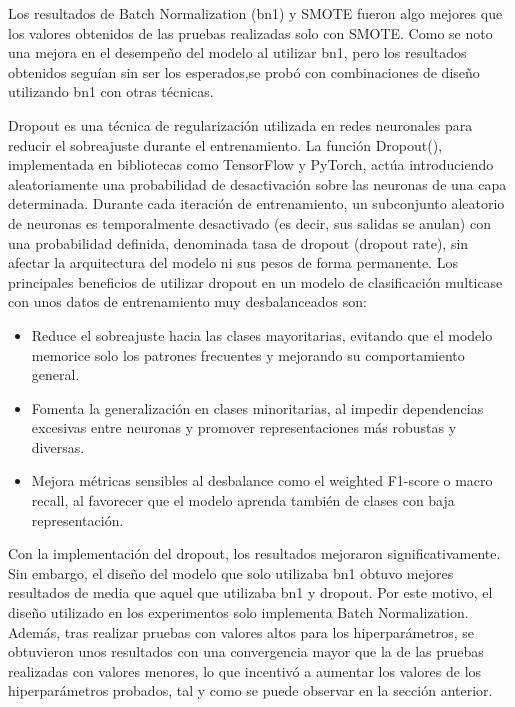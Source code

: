 Los resultados de Batch Normalization (bn1) y SMOTE fueron algo mejores que los valores obtenidos de las pruebas realizadas solo con SMOTE. Como se noto una mejora en el desempeño del modelo al utilizar bn1, pero los resultados obtenidos seguían sin ser los esperados,se probó con combinaciones de diseño utilizando bn1 con otras técnicas.

Dropout es una técnica de regularización utilizada en redes neuronales para reducir el sobreajuste durante el entrenamiento. La función Dropout(), implementada en bibliotecas como TensorFlow y PyTorch, actúa introduciendo aleatoriamente una probabilidad de desactivación sobre las neuronas de una capa determinada. Durante cada iteración de entrenamiento, un subconjunto aleatorio de neuronas es temporalmente desactivado (es decir, sus salidas se anulan) con una probabilidad definida, denominada tasa de dropout (dropout rate), sin afectar la arquitectura del modelo ni sus pesos de forma permanente. Los principales beneficios de utilizar dropout en un modelo de clasificación multicase con unos datos de entrenamiento muy desbalanceados son:

\begin{itemize}
	\item Reduce el sobreajuste hacia las clases mayoritarias, evitando que el modelo memorice solo los patrones frecuentes y mejorando su comportamiento general.

	\item Fomenta la generalización en clases minoritarias, al impedir dependencias excesivas entre neuronas y promover representaciones más robustas y diversas.

	\item Mejora métricas sensibles al desbalance como el weighted F1-score o macro recall, al favorecer que el modelo aprenda también de clases con baja representación.
\end{itemize}

Con la implementación del dropout, los resultados mejoraron significativamente. Sin embargo, el diseño del modelo que solo utilizaba bn1 obtuvo mejores resultados de media que aquel que utilizaba bn1 y dropout. Por este motivo, el diseño utilizado en los experimentos solo implementa Batch Normalization. Además, tras realizar pruebas con valores altos para los hiperparámetros, se obtuvieron unos resultados con una convergencia mayor que la de las pruebas realizadas con valores menores, lo que incentivó a aumentar los valores de los hiperparámetros probados, tal y como se puede observar en la sección anterior.



